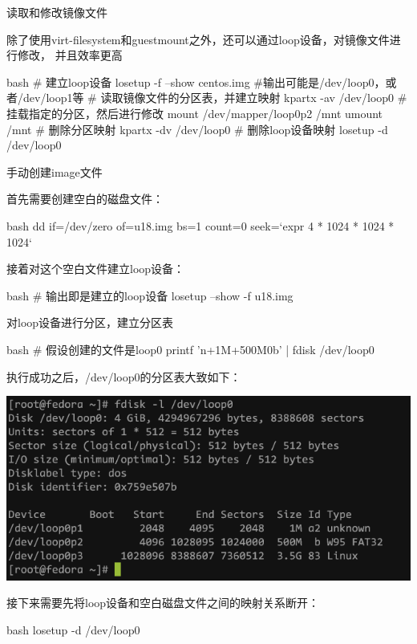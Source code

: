 \begin{outline}[enumerate]
\1 读取和修改镜像文件

除了使用virt-filesystem和guestmount之外，还可以通过loop设备，对镜像文件进行修改，
并且效率更高
\begin{code-block}{bash}
# 建立loop设备
losetup -f --show centos.img #输出可能是/dev/loop0，或者/dev/loop1等
# 读取镜像文件的分区表，并建立映射
kpartx -av /dev/loop0
# 挂载指定的分区，然后进行修改
mount /dev/mapper/loop0p2 /mnt
umount /mnt
# 删除分区映射
kpartx -dv /dev/loop0
# 删除loop设备映射
losetup -d /dev/loop0
\end{code-block}

\1 手动创建image文件

首先需要创建空白的磁盘文件：
\begin{code-block}{bash}
dd if=/dev/zero of=u18.img bs=1 count=0 seek=`expr 4 * 1024 * 1024 * 1024`
\end{code-block}

接着对这个空白文件建立loop设备：
\begin{code-block}{bash}
# 输出即是建立的loop设备
losetup --show -f u18.img
\end{code-block}

对loop设备进行分区，建立分区表
\begin{code-block}{bash}
# 假设创建的文件是loop0
printf 'n\np{}\n\n+1M\nt{}\nn\np{}\n\n+500M\nt\n\n0b\nn\np\n\n\n\n\nwq\n' | fdisk /dev/loop0
\end{code-block}
执行成功之后，/dev/loop0的分区表大致如下：
\par\begin{minipage}{\linewidth}
  \centering
  \includegraphics[width=\linewidth]{loop_partition.png}
  \label{fig:loop_partition}
\end{minipage}

接下来需要先将loop设备和空白磁盘文件之间的映射关系断开：
\begin{code-block}{bash}
losetup -d /dev/loop0
\end{code-block}


\end{outline}
